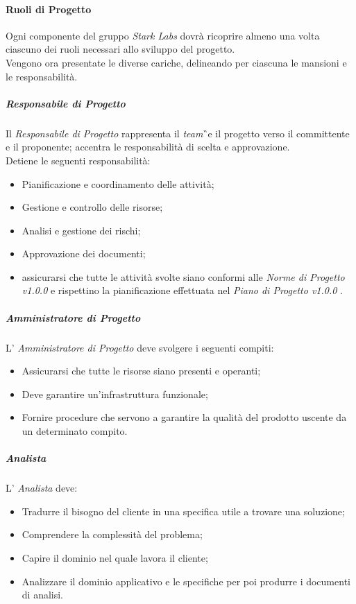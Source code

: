 \paragraph{Ruoli di Progetto}
Ogni componente del gruppo \textit{Stark Labs} dovrà ricoprire almeno una volta ciascuno dei ruoli necessari allo sviluppo del progetto.\\
Vengono ora presentate le diverse cariche, delineando per ciascuna le mansioni e le responsabilità.

\subparagraph{Responsabile di Progetto} Il \textit{Responsabile di Progetto} rappresenta il \textit{team}\G\ e il progetto verso il committente e il proponente; accentra le responsabilità di scelta e approvazione.\\
Detiene le seguenti responsabilità:
\begin{itemize}
\item Pianificazione e coordinamento delle attività;
\item Gestione e controllo delle risorse;
\item Analisi e gestione dei rischi;
\item Approvazione dei documenti;
\item assicurarsi che tutte le attività svolte siano conformi alle \textit{Norme di Progetto
v1.0.0} e rispettino la pianificazione effettuata nel \textit{Piano di Progetto v1.0.0} .
\end{itemize}  

\subparagraph{Amministratore di Progetto} L' \textit{Amministratore di Progetto} deve svolgere i seguenti compiti:
\begin{itemize}
\item Assicurarsi che tutte le risorse siano presenti e operanti; 
\item Deve garantire un'infrastruttura funzionale;
\item Fornire procedure che servono a garantire la qualità del prodotto uscente da un
determinato compito.
\end{itemize}

\subparagraph{Analista} L' \textit{Analista} deve:
\begin{itemize}
\item Tradurre il bisogno del cliente in una specifica utile a trovare una soluzione;
\item Comprendere la complessità del problema;
\item Capire il dominio nel quale lavora il cliente;
\item Analizzare il dominio applicativo e le specifiche per poi produrre i documenti di analisi.
\end{itemize}
